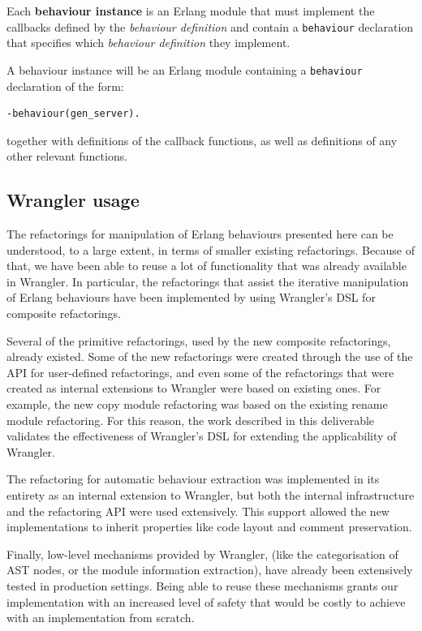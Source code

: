 Each \textbf{behaviour instance} is an Erlang module that must implement the callbacks
defined by the \emph{behaviour definition} and contain a \texttt{behaviour}
declaration that specifies which \emph{behaviour definition} they
implement. 

A behaviour instance will be an Erlang module containing a \texttt{behaviour} declaration of the form:\begin{verbatim}
-behaviour(gen_server).
\end{verbatim}
together with definitions of the callback functions, as well as definitions of any other relevant functions.

\subsection{Wrangler usage}\label{wrangler-usage}

The refactorings for manipulation of Erlang behaviours presented here can be understood, to a large extent, in terms of 
smaller existing refactorings. Because of that, we have been able to reuse a lot of functionality that was already 
available in Wrangler. In particular, the refactorings that assist the iterative manipulation of Erlang behaviours have 
been implemented by using Wrangler's DSL for composite refactorings.

Several of the primitive refactorings, used by the new composite refactorings, already existed. Some of the 
new refactorings were created through the use of the API for user-defined refactorings, and even some of the 
refactorings that were created as internal extensions to Wrangler were based on 
existing ones. For example, the new copy module refactoring was based on the 
existing rename module refactoring. For this reason, the work described in this 
deliverable validates the effectiveness of Wrangler's DSL for extending the applicability of Wrangler.

The refactoring for automatic behaviour extraction was implemented in its entirety as an internal extension to 
Wrangler, but both the internal infrastructure and the refactoring API were used extensively. This support allowed the 
new implementations to inherit properties like code layout and comment preservation.

Finally, low-level mechanisms provided by Wrangler, (like the categorisation of AST nodes, or the module information 
extraction), have already been extensively tested in production settings. Being able to reuse these mechanisms grants 
our implementation with an increased level of safety that would be costly to achieve with an implementation from 
scratch.

